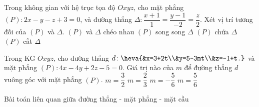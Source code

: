 	\begin{ex}%
	Trong không gian với hệ trục tọa độ $Oxyz$, cho mặt phẳng $(P)\colon2x-y-z+3=0$, và đường thẳng $\Delta\colon\dfrac{x+1}{1}=\dfrac{y-1}{-2}=\dfrac{z}{2}$. Xét vị trí tương đối của $(P)$ và $\Delta$. 
	\choice
	{$(P)$ và $\Delta$ chéo nhau}
	{$(P)$ song song $\Delta$}
	{$(P)$ chứa $\Delta$}
	{\True $(P)$ cắt $\Delta$}
	\end{ex}
	\begin{ex}%
	Trong KG $Oxyz$, cho đường thẳng $d\colon\heva{&x=3+2t\\&y=5-3mt\\&z=-1+t.}$ và mặt phẳng $(P)\colon4x-4y+2z-5=0$. Giá trị nào của $m$ để đường thẳng $d$ vuông góc với mặt phẳng $(P)$. 
	\choice
	{$m=\dfrac{3}{2}$}
	{\True $m=\dfrac{2}{3}$}
	{$m=-\dfrac{5}{6}$}
	{$m=\dfrac{5}{6}$}
	\end{ex}
	\begin{dang}{Bài toán liên quan giữa đường thẳng - mặt phẳng - mặt cầu}%
	\end{dang}
 \setcounter{subsubsection}{0}
 \setcounter{vd}{0}
 \setcounter{ex}{0}
